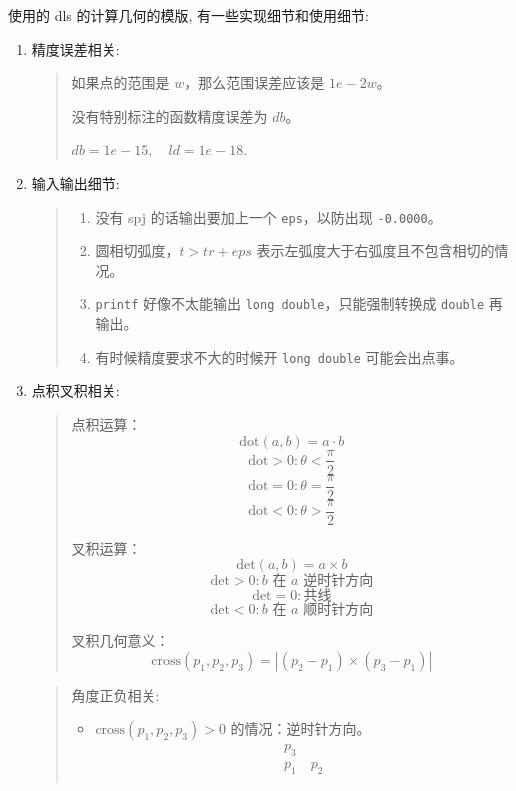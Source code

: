 \documentclass[a4paper,12pt]{article}
\begin{document}
\noindent 使用的 dls 的计算几何的模版, 有一些实现细节和使用细节:

\begin{enumerate}
    \item 精度误差相关:
    \begin{quote}
        如果点的范围是 \( w \)，那么范围误差应该是 \( 1e-2w \)。

        没有特别标注的函数精度误差为 \( db \)。

        \( db = 1e-15, \quad ld = 1e-18. \)\\
    \end{quote}
    \item 输入输出细节:
    \begin{quote}
    \begin{enumerate}
        \item 没有 spj 的话输出要加上一个 \texttt{eps}，以防出现 \texttt{-0.0000}。
    
        \item 圆相切弧度，\( t > tr + eps \) 表示左弧度大于右弧度且不包含相切的情况。
        
        \item \texttt{printf} 好像不太能输出 \texttt{long double}，只能强制转换成 \texttt{double} 再输出。
        
        \item 有时候精度要求不大的时候开 \texttt{long double} 可能会出点事。\\
    \end{enumerate}
    \end{quote}
    \item 点积叉积相关:
    \begin{quote}
        点积运算：
        \[ \text{dot}(a, b) = a \cdot b \]
        \[ \text{dot} > 0: \theta < \frac{\pi}{2} \]
        \[ \text{dot} = 0: \theta = \frac{\pi}{2} \]
        \[ \text{dot} < 0: \theta > \frac{\pi}{2} \]
        
        叉积运算：
        \[ \text{det}(a, b) = a \times b \]
        \[ \text{det} > 0: b \text{ 在 } a \text{ 逆时针方向} \]
        \[ \text{det} = 0: \text{共线} \]
        \[ \text{det} < 0: b \text{ 在 } a \text{ 顺时针方向} \]
        
        叉积几何意义：
        \[ \text{cross}(p_1, p_2, p_3) = |(p_2 - p_1) \times (p_3 - p_1)| \]      
    \end{quote}
    \begin{quote}
        角度正负相关:      
    \begin{itemize}
        \item \( \text{cross}(p_1, p_2, p_3) > 0 \) 的情况：逆时针方向。
        \[
        \begin{array}{c}
        p_3 \\
        p_1 \quad p_2 \\
        \end{array}
        \]
        

\end{itemize}
\end{quote}
\end{enumerate}
\end{document}
